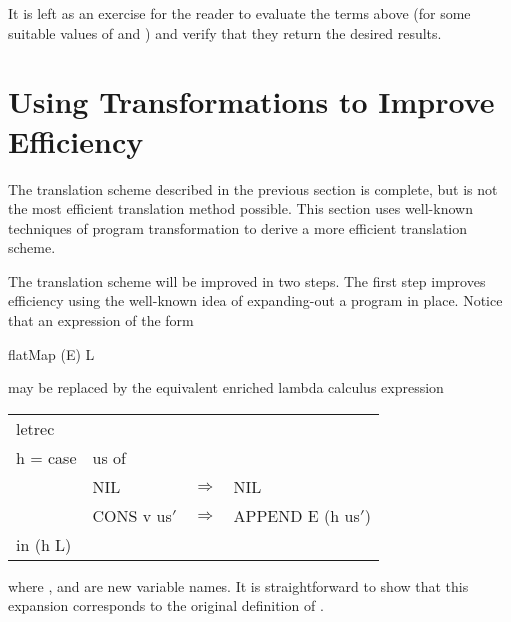 \vs

\noindent
It is left as an exercise for the reader to evaluate the terms above (for some
suitable values of  and ) and verify that they return the desired results.

\section{Using Transformations to Improve Efficiency}

The translation scheme described in the previous section is complete, but is
not the most efficient translation method possible. This section uses well-known
techniques of program transformation to derive a more efficient
translation scheme.

The translation scheme will be improved in two steps. The first step
improves efficiency using the well-known idea of expanding-out a program in
place. Notice that an expression of the form
\begin{mlcoded}
    flatMap (E) L
\end{mlcoded}
may be replaced by the equivalent enriched lambda calculus expression
\begin{mlcoded}
{ %
    \setlength{\tabcolsep}{5pt}
    \begin{tabular}{llll}
    letrec & & & \\
    \quad h = \tlb{us}case & us of & &\\
    & NIL & $\Rightarrow$ & NIL \\
    & CONS v us$'$ &  $\Rightarrow$ & APPEND E (h us$'$) \\
    in (h L) & & &
    \end{tabular}
}
\end{mlcoded}
where ,  and  are new variable names. It is straightforward to show that
this expansion corresponds to the original definition of .


